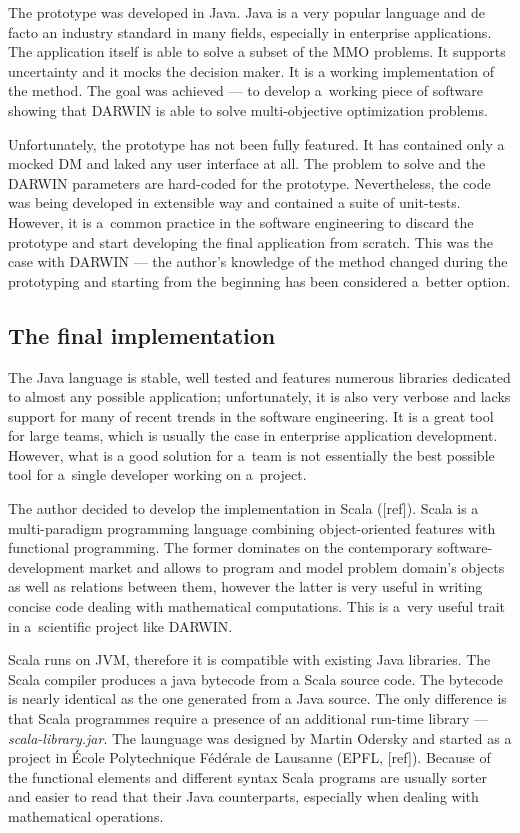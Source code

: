 The prototype was developed in Java. Java is a very popular language and de
facto an industry standard in many fields, especially in enterprise
applications. The application itself is able to solve a subset of the MMO
problems. It supports uncertainty and it mocks the decision maker. It is a
working implementation of the method. The goal was achieved --- to develop
a~working piece of software showing that DARWIN is able to solve
multi-objective optimization problems. 

Unfortunately, the prototype has not been fully featured. It has contained
only a mocked DM and laked any user interface at all. The problem to solve and
the DARWIN parameters are hard-coded for the prototype. Nevertheless, the code
was being developed in extensible way and contained a suite of
unit-tests. However, it is a~common practice in the software engineering to
discard the prototype and start developing the final application from scratch.
This was the case with DARWIN --- the author's knowledge of the method changed
during the prototyping and starting from the beginning has been considered
a~better option.

\subsection{The final implementation}
The Java language is stable, well tested and features numerous libraries
dedicated to almost any possible application; unfortunately, it is also very
verbose and lacks support for many of recent trends in the software
engineering. It is a great tool for large teams, which is usually the case in
enterprise application development. However, what is a good solution for
a~team is not essentially the best possible tool for a~single developer
working on a~project.

The author decided to develop the implementation in Scala ([ref]). Scala is a
multi-paradigm programming language combining object-oriented features with
functional programming. The former dominates on the contemporary
software-development market and allows to program and model problem domain's
objects as well as relations between them, however the latter is very useful
in writing concise code dealing with mathematical computations. This is a~very
useful trait in a~scientific project like DARWIN.

Scala runs on JVM, therefore it is compatible with existing Java
libraries. The Scala compiler produces a java bytecode from a Scala source
code. The bytecode is nearly identical as the one generated from a Java
source. The only difference is that Scala programmes require a presence of an
additional run-time library --- \textit{scala-library.jar}. The launguage was
designed by Martin Odersky and started as a project in École Polytechnique
Fédérale de Lausanne (EPFL, [ref]). Because of the functional elements and
different syntax Scala programs are usually sorter and easier to read that
their Java counterparts, especially when dealing with mathematical operations.

